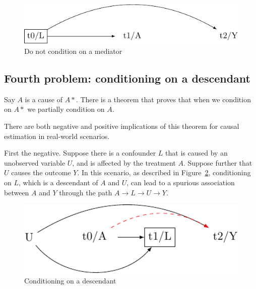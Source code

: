 \documentclass[
  singlecolumn]{report}
\begin{document}
\begin{figure}

{\centering \includegraphics[width=1\textwidth,height=\textheight]{causal-dags_files/figure-pdf/fig-dag-mediator-solution-1.pdf}

}

\caption{\label{fig-dag-mediator-solution}Do not condition on a
mediator}

\end{figure}

\hypertarget{fourth-problem-conditioning-on-a-descendant}{%
\subsection{Fourth problem: conditioning on a
descendant}\label{fourth-problem-conditioning-on-a-descendant}}

Say \(A\) is a cause of \(A*\). There is a theorem that proves that when
we condition on \(A*\) we partially condition on \(A\).

There are both negative and positive implications of this theorem for
causal estimation in real-world scenarios.

First the negative. Suppose there is a confounder \(L\) that is caused
by an unobserved variable \(U\), and is affected by the treatment \(A\).
Suppose further that \(U\) causes the outcome \(Y\). In this scenario,
as described in Figure~\ref{fig-dag-descendent}, conditioning on \(L\),
which is a descendant of \(A\) and \(U\), can lead to a spurious
association between \(A\) and \(Y\) through the path
\(A \to L \to U \to Y\).

\begin{figure}

{\centering \includegraphics[width=1\textwidth,height=\textheight]{causal-dags_files/figure-pdf/fig-dag-descendent-1.pdf}

}

\caption{\label{fig-dag-descendent}Conditioning on a descendant}

\end{figure}
\end{document}

